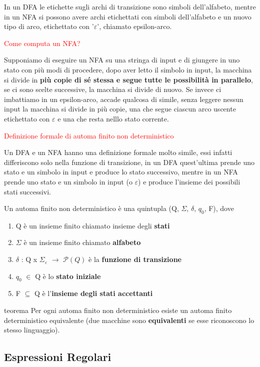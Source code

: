\documentclass{article}
\begin{document}
In un DFA le etichette sugli archi di transizione sono simboli dell'alfabeto,
mentre in un NFA si possono avere archi etichettati con simboli dell'alfabeto e
un nuovo tipo di arco, etichettato con '$\varepsilon$', chiamato epsilon-arco.

\noindent \textcolor{red}{Come computa un NFA?}

Supponiamo di eseguire un NFA su una stringa di input e di giungere in uno stato
con più modi di procedere, dopo aver letto il simbolo in input, la macchina si
divide in \textbf{più copie di sé stessa e segue tutte le possibilità in
parallelo}, se ci sono scelte successive, la macchina si divide di nuovo. Se
invece ci imbattiamo in un epsilon-arco, accade qualcosa di simile, senza
leggere nessun input la macchina si divide in più copie, una che segue ciascun
arco uscente etichettato con $\varepsilon$ e una che resta nelllo stato
corrente.

\textcolor{red}{Definizione formale di automa finito non deterministico}

Un DFA e un NFA hanno una definizione formale molto simile, essi infatti
differiscono solo nella funzione di transizione, in un DFA quest'ultima prende
uno stato e un simbolo in input e produce lo stato successivo, mentre in un NFA
prende uno stato e un simbolo in input (o $\varepsilon$) e produce l'insieme dei
possibili stati successivi.

Un automa finito non deterministico è una quintupla (Q, $\Sigma$, $\delta$,
$q_0$, F), dove
\begin{enumerate}
    \item Q è un insieme finito chiamato insieme degli \textbf{stati}
    \item $\Sigma$ è un insieme finito chiamato \textbf{alfabeto}
    \item $\delta$ : Q x $\Sigma_\varepsilon$ $\rightarrow$ $\mathcal{P}(Q)$ è
    la \textbf{funzione di transizione}
    \item $q_0$ $\in$ Q è lo \textbf{stato iniziale}
    \item F $\subseteq$ Q è l'\textbf{insieme degli stati accettanti}
\end{enumerate}

\textcolor{green! 50! black}{teorema}
Per ogni automa finito non deterministico esiste un automa finito deterministico
equivalente (due macchine sono \textbf{equivalenti} se esse riconoscono lo
stesso linguaggio).

\subsection{Espressioni Regolari}
\end{document}

